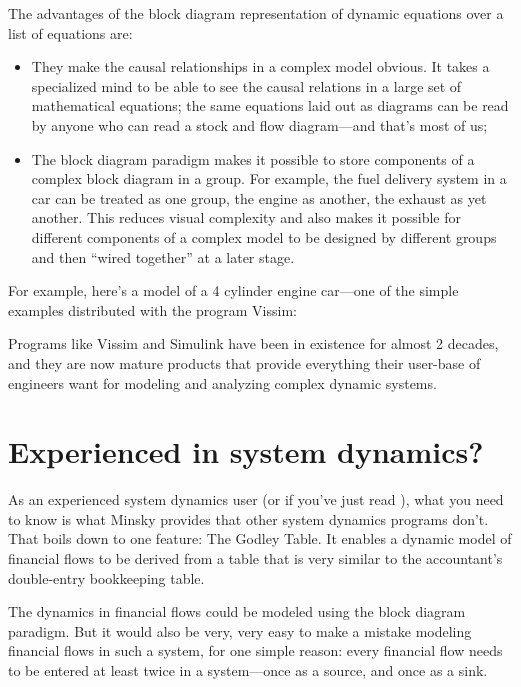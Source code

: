 The advantages of the block diagram representation of dynamic equations
over a list of equations are:
\begin{itemize}
\item    They make the causal relationships in a complex model
  obvious. It takes a specialized mind to be able to see the causal
  relations in a large set of mathematical equations; the same
  equations laid out as diagrams can be read by anyone who can read
  a stock and flow diagram---and that's most of us;
\item The block diagram paradigm makes it possible to store components of
  a complex block diagram in a group. For example, the fuel delivery
  system in a car can be treated as one group, the engine as another,
  the exhaust as yet another. This reduces visual complexity and also
  makes it possible for different components of a complex model to be
  designed by different groups and then ``wired together'' at a later
  stage.
\end{itemize}

For example, here's a model of a 4 cylinder engine car---one of the
simple examples distributed with the program Vissim:

\begin{center}
\end{center}

Programs like Vissim and Simulink have been in existence for almost 2
decades, and they are now mature products that provide everything
their user-base of engineers want for modeling and analyzing complex
dynamic systems. 

\section{Experienced in system dynamics?}
\label{intro:experienced}

As an experienced system dynamics user (or if you've just read ), what you need to know is what Minsky
provides that other system dynamics programs don't. That boils down to
one feature: The Godley Table. It enables a dynamic model of
financial flows to be derived from a table that is very similar to the
accountant's double-entry bookkeeping table.


The dynamics in financial flows could be modeled using the block diagram
paradigm. But it would also be very, very easy to make a mistake
modeling financial flows in such a system, for one simple reason:
every financial flow needs to be entered at least twice in a
system---once as a source, and once as a sink.


